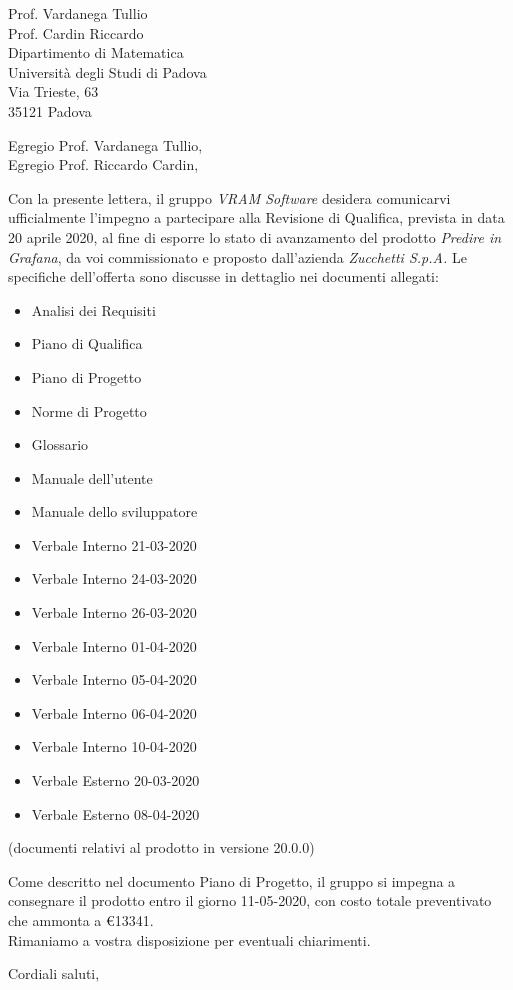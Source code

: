 \documentclass[a4paper,12pt]{letteracdp}
\date{13 aprile 2020}
\begin{document}
\begin{letter}{
		Prof. Vardanega Tullio \\
		Prof. Cardin Riccardo \\
		Dipartimento di Matematica \\
		Università degli Studi di Padova \\
		Via Trieste, 63 \\
		35121 Padova}
	
	\opening{Egregio Prof. Vardanega Tullio, \\ \noindent Egregio Prof. Riccardo Cardin,}
	
	\begin{flushleft}
	Con la presente lettera, il gruppo \textit{VRAM Software} desidera comunicarvi ufficialmente l'impegno a partecipare alla Revisione di Qualifica, prevista in data 20 aprile 2020, al fine di esporre lo stato di avanzamento del prodotto \textit{Predire in Grafana}, da voi commissionato e proposto dall'azienda \textit{Zucchetti S.p.A.}
	Le specifiche dell'offerta sono discusse in dettaglio nei documenti allegati: \\ 
	\end{flushleft}

	\begin{itemize}
		\item Analisi dei Requisiti 
		\item Piano di Qualifica 
		\item Piano di Progetto 
		\item Norme di Progetto 
		\item Glossario
		
		\item Manuale dell'utente
		\item Manuale dello sviluppatore
		
		\item Verbale Interno 21-03-2020
		\item Verbale Interno 24-03-2020
		\item Verbale Interno 26-03-2020
		\item Verbale Interno 01-04-2020
		\item Verbale Interno 05-04-2020
		\item Verbale Interno 06-04-2020
		\item Verbale Interno 10-04-2020
		
		\item Verbale Esterno 20-03-2020
		\item Verbale Esterno 08-04-2020
	\end{itemize}
		(documenti relativi al prodotto in versione 20.0.0)

	\begin{flushleft}
		\noindent Come descritto nel documento Piano di Progetto, il gruppo si impegna a consegnare il prodotto entro il giorno 11-05-2020, con costo totale preventivato che ammonta a \euro{13341}.
	\\
	
	Rimaniamo a vostra disposizione per eventuali chiarimenti.
	\end{flushleft}

	\closing{Cordiali saluti,}
	
\end{letter}	
\end{document}

